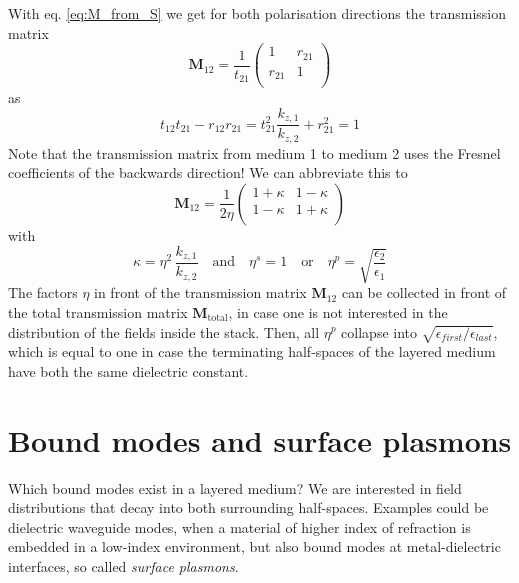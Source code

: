 With eq.  \ref{eq:M_from_S} we get for both polarisation directions the transmission matrix
\begin{equation}
\mathbf{M}_{12} = \frac{1}{t_{21}} 
\begin{pmatrix}
1 & r_{21} \\ r_{21} & 1 \\
\end{pmatrix}
\end{equation}
as 
\begin{equation}
t_{12} t_{21} - r_{12}r_{21} = t_{21}^2 \frac{k_{z,1}}{k_{z,2}} + r_{21}^2 = 1
\end{equation}
Note that the transmission matrix from medium 1 to medium 2 uses the Fresnel coefficients of the backwards direction!
We can abbreviate this to
\begin{equation}
\mathbf{M}_{12} 
=\frac{ 1}{2 \eta }
\begin{pmatrix}
1 + \kappa & 1  -\kappa \\  1  - \kappa  & 1 + \kappa \\
\end{pmatrix} \label{eq:M_kappa}
\end{equation}
with 
\begin{equation}
\kappa = \eta^2 \,
\frac{  k_{z,1} }{ k_{z,2}}
\quad
\text{and}
\quad
\eta^s = 1 \quad \text{or} \quad \eta^p = \sqrt{ \frac{\epsilon_2}{\epsilon_1} }
\end{equation}
The factors $\eta$ in front of the transmission matrix $\mathbf{M}_{12} $ can be collected in front of the total transmission matrix $\mathbf{M}_\text{total}$, in case one is not interested in the distribution of the fields inside the stack. Then, all $\eta^p$ collapse into $\sqrt{\epsilon_{first} / \epsilon_{last}}$, which is equal to one in case the terminating half-spaces of the layered medium have both the same dielectric constant. 



\section{Bound modes and surface plasmons}

Which bound modes exist in a layered medium? We are interested in field distributions that decay into both surrounding half-spaces. Examples could be dielectric waveguide modes, when a material of higher index of refraction is embedded in a low-index environment, but also bound modes at metal-dielectric interfaces, so called \emph{surface plasmons}.

